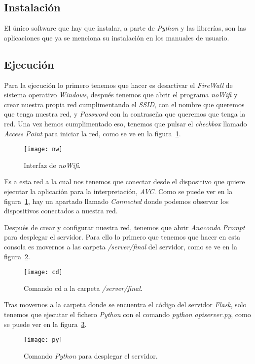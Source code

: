 \subsection{Instalación}
El único software que hay que instalar, a parte de \textit{Python} y las librerías, son las aplicaciones que ya se menciona su instalación en los manuales de usuario.

\subsection{Ejecución}
Para la ejecución lo primero tenemos que hacer es desactivar el \textit{FireWall} de sistema operativo \textit{Windows}, después tenemos que abrir el programa \textit{noWifi} y crear nuestra propia red cumplimentando el \textit{SSID}, con el nombre que queremos que tenga nuestra red, y \textit{Password} con la contraseña que queremos que tenga la red. Una vez hemos cumplimentado eso, tenemos que pulsar el \textit{checkbox} llamado \textit{Access Point} para iniciar la red, como se ve en la figura~\ref{fig:nw}.

\begin{figure}
	\centering
	\texttt{[image: nw]}
	\caption{Interfaz de \textit{noWifi}.}
	\label{fig:nw}
\end{figure}

Es a esta red a la cual nos tenemos que conectar desde el dispositivo que quiere ejecutar la aplicación para la interpretación, \textit{AVC}. Como se puede ver en la figura~\ref{fig:nw}, hay un apartado llamado \textit{Connected} donde podemos observar los dispositivos conectados a nuestra red.

Después de crear y configurar nuestra red, tenemos que abrir \textit{Anaconda Prompt} para desplegar el servidor. Para ello lo primero que tenemos que hacer en esta consola es movernos a las carpeta \textit{/server/final} del servidor, como se ve en la figura~\ref{fig:cd}.

\begin{figure}
	\centering
	\texttt{[image: cd]}
	\caption{Comando cd a la carpeta \textit{/server/final}.}
	\label{fig:cd}
\end{figure}

Tras movernos a la carpeta donde se encuentra el código del servidor \textit{Flask}, solo tenemos que ejecutar el fichero \textit{Python} con el comando \textit{python apiserver.py}, como se puede ver en la figura~\ref{fig:py}.

\begin{figure}
	\centering
	\texttt{[image: py]}
	\caption{Comando \textit{Python} para desplegar el servidor.}
	\label{fig:py}
\end{figure}

